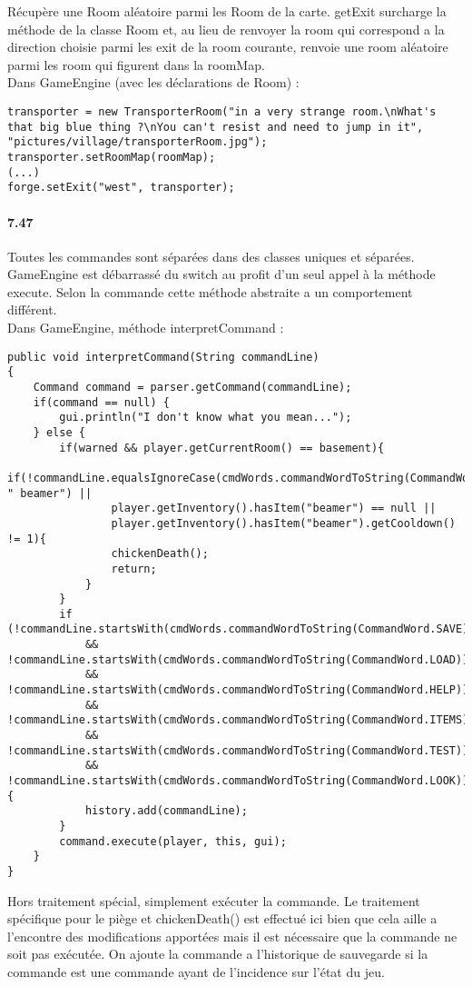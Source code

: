 \documentclass[11pt,a4paper]{report}
\begin{document}
Récupère une Room aléatoire parmi les Room de la carte. getExit surcharge la méthode de la classe Room et, au lieu de renvoyer la room qui correspond a la direction choisie parmi les exit de la room courante, renvoie une room aléatoire parmi les room qui figurent dans la roomMap.\\
Dans GameEngine (avec les déclarations de Room) :
\begin{lstlisting}
transporter = new TransporterRoom("in a very strange room.\nWhat's that big blue thing ?\nYou can't resist and need to jump in it", "pictures/village/transporterRoom.jpg");
transporter.setRoomMap(roomMap);
(...)
forge.setExit("west", transporter);
\end{lstlisting}

\paragraph{7.47}
Toutes les commandes sont séparées dans des classes uniques et séparées. GameEngine est débarrassé du switch au profit d'un seul appel à la méthode execute. Selon la commande cette méthode abstraite a un comportement différent.\\
Dans GameEngine, méthode interpretCommand :
\begin{lstlisting}
public void interpretCommand(String commandLine)
{
    Command command = parser.getCommand(commandLine);
    if(command == null) {
        gui.println("I don't know what you mean...");
    } else {
        if(warned && player.getCurrentRoom() == basement){
            if(!commandLine.equalsIgnoreCase(cmdWords.commandWordToString(CommandWord.USE)+ " beamer") ||
                player.getInventory().hasItem("beamer") == null ||
                player.getInventory().hasItem("beamer").getCooldown() != 1){
                chickenDeath();
                return;
            }
        }
        if (!commandLine.startsWith(cmdWords.commandWordToString(CommandWord.SAVE))
            && !commandLine.startsWith(cmdWords.commandWordToString(CommandWord.LOAD))
            && !commandLine.startsWith(cmdWords.commandWordToString(CommandWord.HELP))
            && !commandLine.startsWith(cmdWords.commandWordToString(CommandWord.ITEMS))
            && !commandLine.startsWith(cmdWords.commandWordToString(CommandWord.TEST))
            && !commandLine.startsWith(cmdWords.commandWordToString(CommandWord.LOOK))) {
            history.add(commandLine);
        }
        command.execute(player, this, gui);
    }
}
\end{lstlisting}
Hors traitement spécial, simplement exécuter la commande. Le traitement spécifique pour le piège et chickenDeath() est effectué ici bien que cela aille a l'encontre des modifications apportées mais il est nécessaire que la commande ne soit pas exécutée. On ajoute la commande a l'historique de sauvegarde si la commande est une commande ayant de l'incidence sur l'état du jeu.
\end{document}
